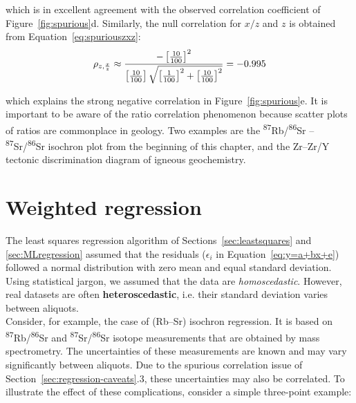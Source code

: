 \begin{enumerate}
\noindent which is in excellent agreement with the observed
correlation coefficient of Figure~\ref{fig:spurious}d. Similarly, the
null correlation for $x/z$ and $z$ is obtained from
Equation~\ref{eq:spuriouszxz}:
\begin{equation*}
  \noindent \rho_{z,\frac{x}{z}} \approx
  \frac{
    - \left[\frac{10}{100}\right]^2
  }{
    \left[\frac{10}{100}\right]
    \sqrt{\left[\frac{1}{100}\right]^2 +
      \left[\frac{10}{100}\right]^2
    }
  } = -0.995
\end{equation*}

\noindent which explains the strong negative correlation in
Figure~\ref{fig:spurious}e.  It is important to be aware of the ratio
correlation phenomenon because scatter plots of ratios are commonplace
in geology. Two examples are the
\textsuperscript{87}Rb/\textsuperscript{86}Sr --
\textsuperscript{87}Sr/\textsuperscript{86}Sr isochron plot from the
beginning of this chapter, and the Zr--Zr/Y tectonic discrimination
diagram of igneous geochemistry.
 
\end{enumerate}

\section{Weighted regression}
\label{sec:weightedregression}

The least squares regression algorithm of
Sections~\ref{sec:leastsquares} and \ref{sec:MLregression} assumed
that the residuals ($\epsilon_i$ in Equation~\ref{eq:y=a+bx+e})
followed a normal distribution with zero mean and equal standard
deviation. Using statistical jargon, we assumed that the data are
\emph{homoscedastic}. However, real datasets are often
\textbf{heteroscedastic}, i.e. their standard deviation varies between
aliquots.\\

Consider, for example, the case of (Rb--Sr) isochron regression.  It
is based on \textsuperscript{87}Rb/\textsuperscript{86}Sr and
\textsuperscript{87}Sr/\textsuperscript{86}Sr isotope measurements
that are obtained by mass spectrometry. The uncertainties of these
measurements are known and may vary significantly between
aliquots. Due to the spurious correlation issue of
Section~\ref{sec:regression-caveats}.3, these uncertainties may also
be correlated. To illustrate the effect of these complications,
consider a simple three-point example:

